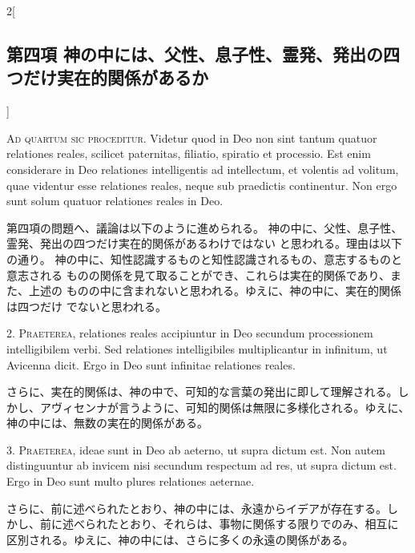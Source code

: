 \documentclass[paper=a4paper,fontsize=10pt,jafontsize=9pt,titlepage]{jlreq}
\begin{document}
\begin{paracol}{2}[\subsection{第四項 神の中には、父性、息子性、霊発、発出の四つだけ実在的関係があるか}]

{\Huge A}{\scshape d quartum sic proceditur}. Videtur quod in Deo non sint tantum quatuor
relationes reales, scilicet paternitas, filiatio, spiratio et
processio. Est enim considerare in Deo relationes intelligentis ad
intellectum, et volentis ad volitum, quae videntur esse relationes
reales, neque sub praedictis continentur. Non ergo sunt solum quatuor
relationes reales in Deo.


\switchcolumn


第四項の問題へ、議論は以下のように進められる。
神の中に、父性、息子性、霊発、発出の四つだけ実在的関係があるわけではない
 と思われる。理由は以下の通り。
神の中に、知性認識するものと知性認識されるもの、意志するものと意志される
 ものの関係を見て取ることができ、これらは実在的関係であり、また、上述の
 ものの中に含まれないと思われる。ゆえに、神の中に、実在的関係は四つだけ
 でないと思われる。




2. {\scshape Praeterea}, relationes reales accipiuntur in Deo secundum processionem
intelligibilem verbi. Sed relationes intelligibiles multiplicantur in
infinitum, ut Avicenna dicit. Ergo in Deo sunt infinitae relationes
reales.


\switchcolumn


さらに、実在的関係は、神の中で、可知的な言葉の発出に即して理解される。し
 かし、アヴィセンナが言うように、可知的関係は無限に多様化される。ゆえに、
 神の中には、無数の実在的関係がある。




3. {\scshape Praeterea}, ideae sunt in Deo ab aeterno, ut supra dictum est. Non autem
distinguuntur ab invicem nisi secundum respectum ad res, ut supra dictum
est. Ergo in Deo sunt multo plures relationes aeternae.


\switchcolumn


さらに、前に述べられたとおり、神の中には、永遠からイデアが存在する。し
 かし、前に述べられたとおり、それらは、事物に関係する限りでのみ、相互に
 区別される。ゆえに、神の中には、さらに多くの永遠の関係がある。



\end{paracol}
\end{document}
